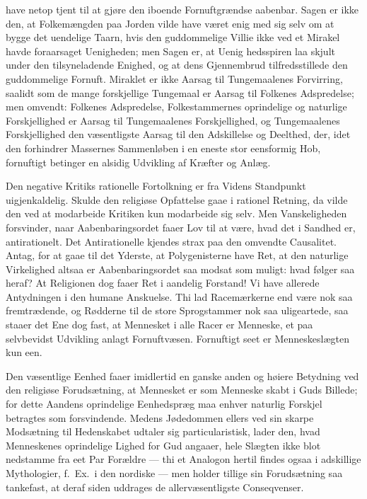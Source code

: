 \documentclass[12pt]{book}
\begin{document}
have netop tjent til at gjøre den iboende Fornuftgrændse aabenbar.
Sagen er ikke den, at Folkemængden paa Jorden vilde have været enig
med sig selv om at bygge det uendelige Taarn, hvis den guddommelige
Villie ikke ved et Mirakel havde foraarsaget Uenigheden; men Sagen
er, at Uenig\-
hedsspiren laa skjult under den tilsyneladende Enighed, og at dens
Gjennembrud tilfredsstillede den guddommelige Fornuft. Miraklet er
ikke Aarsag til Tungemaalenes Forvirring, saalidt som de mange
forskjellige Tungemaal er Aarsag til Folkenes Adspredelse; men
omvendt: Folkenes Adspredelse, Folkestammernes oprindelige og
naturlige Forskjellighed er Aarsag til Tungemaalenes Forskjellighed,
og Tungemaalenes Forskjellighed den væsentligste Aarsag til den
Adskillelse og Deelthed, der, idet den forhindrer Massernes
Sammenløben i en eneste stor eensformig Hob, fornuftigt betinger en
alsidig Udvikling af Kræfter og Anlæg.

Den negative Kritiks rationelle Fortolkning er fra Videns Standpunkt
uigjenkaldelig. Skulde den religiøse Opfattelse gaae i rationel
Retning, da vilde den ved at modarbeide Kritiken kun modarbeide sig
selv. Men Vanskeligheden forsvinder, naar Aabenbaringsordet faaer
Lov til at være, hvad det i Sandhed er, antirationelt. Det
Antirationelle kjendes strax paa den omvendte Causalitet. Antag, for
at gaae til det Yderste, at Polygenisterne have Ret, at den
naturlige Virkelighed altsaa er Aabenbaringsordet saa modsat som
muligt: hvad følger saa heraf? At Religionen dog faaer Ret i
aandelig Forstand! Vi have allerede Antydningen i den humane
Anskuelse. Thi lad Racemærkerne end være nok saa fremtrædende, og
Rødderne til de store Sprogstammer nok saa uligeartede, saa staaer
det Ene dog fast, at Mennesket i alle Racer er Menneske, et paa
selvbevidst Udvikling anlagt Fornuftvæsen. Fornuftigt seet er
Menneskeslægten kun een.

Den væsentlige Eenhed faaer imidlertid en ganske anden og høiere
Betydning ved den religiøse Forudsætning, at Mennesket er som
Menneske skabt i Guds Billede; for dette Aandens oprindelige
Eenhedspræg maa enhver naturlig Forskjel betragtes som forsvindende.
Medens
Jødedommen ellers ved sin skarpe Modsætning til Hedenskabet udtaler
sig particularistisk, lader den, hvad Menneskenes oprindelige Lighed
for Gud angaaer, hele Slægten ikke blot nedstamme fra eet Par
Forældre --- thi et Analogon hertil findes ogsaa i adskillige
Mythologier, f.\ Ex.\ i den nordiske --- men holder tillige sin
Forudsætning saa tankefast, at deraf siden uddrages de
allervæsentligste Conseqvenser.
\end{document}

